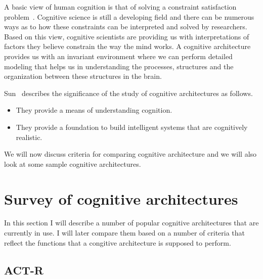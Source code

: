 A basic view of human cognition is that of solving a constraint
satisfaction problem~\cite{Newell:1990aa}.  Cognitive science is still
a developing field and there can be numerous ways as to how these
constraints can be interpreted and solved by researchers.  Based on
this view, cognitive scientists are providing us with interpretations
of factors they believe constrain the way the mind works.
%
A cognitive architecture provides us with an invariant environment
where we can perform detailed modeling that helps us in understanding
the processes, structures and the organization between these
structures in the brain\cite{journals/jetai/Sun07}.

Sun~\cite{journals/jetai/Sun07} describes the significance of the study
of cognitive architectures as follows.
\begin{itemize}
\item They provide a means of understanding cognition.
\item They provide a foundation to build intelligent systems that are
  cognitively realistic.
\end{itemize}

We will now discuss criteria for comparing cognitive architecture and
we will also look at some sample cognitive architectures.

\section{Survey of cognitive architectures}

In this section I will describe a number of popular cognitive
architectures that are currently in use. I will later compare them
based on a number of criteria that reflect the functions that a
congitive architecture is supposed to perform.


\subsection{ACT-R}

